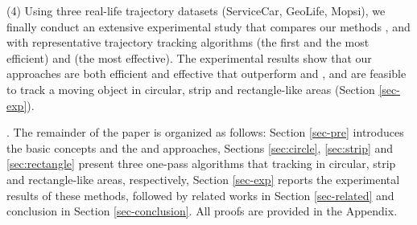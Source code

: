 \ni (4) Using three real-life trajectory datasets (ServiceCar, GeoLife, Mopsi), we finally conduct an extensive experimental study that compares our methods \citt, \sitt and \bitt with  representative trajectory tracking algorithms \ldrh (the first and the most efficient) and \grts (the most effective). The experimental results show that our approaches are both efficient and effective that outperform \ldrh and \grts, and are feasible to track a moving object in circular, strip and rectangle-like areas (Section \ref{sec-exp}).

.
The remainder of the paper is organized as follows:
Section \ref{sec-pre} introduces the basic concepts and the \ldr and \ldrh approaches,
Sections \ref{sec:circle}, \ref{sec:strip} and \ref{sec:rectangle} present three one-pass algorithms that tracking in circular, strip and rectangle-like areas, respectively,
Section \ref{sec-exp} reports the experimental results of these methods, followed by related works in Section \ref{sec-related} and conclusion in Section \ref{sec-conclusion}.
All proofs are provided in the Appendix.


